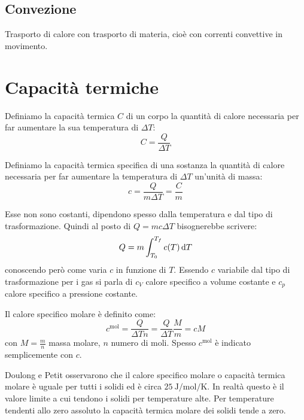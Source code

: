 \subsection{Convezione}
Trasporto di calore con trasporto di materia, cioè con correnti convettive in movimento.


\section{Capacità termiche}
\begin{Def}
   Definiamo la capacità termica $C$ di un corpo la quantità di calore necessaria per far aumentare la sua temperatura di $\Delta T$:
   \begin{equation}
      C=\frac{Q}{\Delta T}
   \end{equation}
\end{Def}
\begin{Def}
   Definiamo la capacità termica specifica di una sostanza la quantità di calore necessaria per far aumentare la temperatura di $\Delta T$ un'unità di massa:
   \begin{equation}
      c=\frac{Q}{m\Delta T}=\frac{C}{m}
   \end{equation}
\end{Def}
Esse non sono costanti, dipendono spesso dalla temperatura e dal tipo di trasformazione. Quindi al posto di $Q=mc\Delta T$ bisognerebbe scrivere:
\begin{equation}
   Q=m\int_{T_0}^{T_f}c(T)\,\mathrm{d} T
\end{equation}
conoscendo però come varia $c$ in funzione di $T$. Essendo $c$ variabile dal tipo di trasformazione per i gas si parla di $c_V$ calore specifico a volume costante e $c_p$ calore specifico a pressione costante.
\begin{Def}
   Il calore specifico molare è definito come:
   \begin{equation}
      c^{\text{mol}}=\frac{Q}{\Delta T n}=\frac{Q}{\Delta T}\frac{M}{m}=cM
   \end{equation}
   con $M=\frac{m}{n}$ massa molare, $n$ numero di moli. Spesso $c^{\text{mol}}$ è indicato semplicemente con $c$.
\end{Def}

Doulong e Petit osservarono che il calore specifico molare o capacità termica molare è uguale per tutti i solidi ed è circa $\SI{25}{\joule\per\mole\per\kelvin}$. In realtà questo è il valore limite a cui tendono i solidi per temperature alte. Per temperature tendenti allo zero assoluto la capacità termica molare dei solidi tende a zero.


